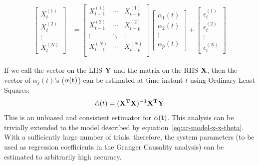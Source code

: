 \documentclass[letterpaper, 10pt, conference]{ieeeconf}
\begin{document}
\begin{align*}
	\left[ \!\! \begin{array}{c}
			X_t^{(1)} \\
			X_t^{(2)} \\
			\vdots \\
			X_t^{(N)}
	\end{array} \!\! \right]
	&=
	\left[ \! \begin{array}{ccc}
			X_{t-1}^{(1)} & \cdots & X_{t-p}^{(1)} \\
			X_{t-1}^{(2)} & \cdots & X_{t-p}^{(2)} \\
			\vdots & \ddots & \vdots \\
			X_{t-1}^{(N)} & \cdots & X_{t-p}^{(N)} \\
	\end{array} \! \right]
	\left[ \!\! \begin{array}{c}
			\alpha_1(t) \\
			\alpha_2(t) \\
			\vdots \\
			\alpha_p(t)
	\end{array} \!\! \right] +
	\left[ \!\! \begin{array}{c}
			\epsilon_t^{(1)} \\
			\epsilon_t^{(2)} \\
			\vdots \\
			\epsilon_t^{(N)}
	\end{array} \!\! \right]
\end{align*}

If we call the vector on the LHS $\bf{Y}$ and the matrix on the RHS $\bf{X}$, then the vector of $\alpha_j(t)$'s ($\bf{\alpha}(t)$) can be estimated at time instant $t$ using Ordinary Least Squares:
\begin{equation*}
	\hat{\bf{\alpha}}(t) = (\bf{X}^T \bf{X})^{-1} \bf{X}^T \bf{Y}
\end{equation*}
This is an unbiased and consistent estimator for $\bf{\alpha}(t)$. This analysis can be trivially extended to the model described by equation~\eqref{eq:ar-model-x-x-theta}. With a sufficiently large number of trials, therefore, the system parameters (to be used as regression coefficients in the Granger Causality analysis) can be estimated to arbitrarily high accuracy.
\end{document}
